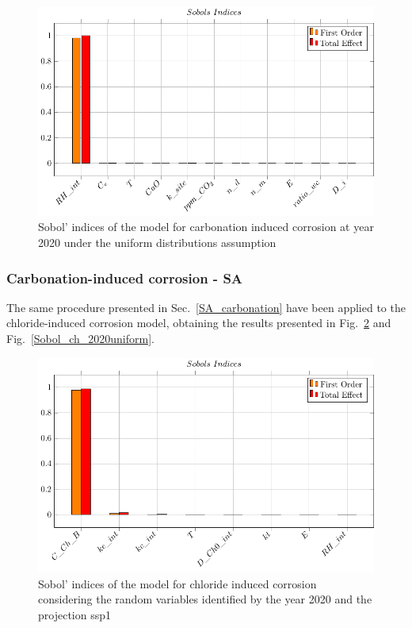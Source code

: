 \begin{figure}[H]
    \centering
    \includegraphics[width=\linewidth]{imgs/pdfs/sobols_indices/carbonation/17_sobols_2020_ssp1.pdf}
    \caption{Sobol' indices of the model for carbonation induced corrosion at year 2020 under the uniform distributions assumption}\label{Sobol_carb_2020uniform}
\end{figure}

\subsubsection{Carbonation-induced corrosion - SA}
The same procedure presented in Sec.~\ref{SA_carbonation} have been applied to the chloride-induced corrosion model, obtaining the results presented in Fig.~\ref{Sobol_ch_2020ssp1} and Fig.~\ref{Sobol_ch_2020uniform}.
\begin{figure}[H]
    \centering
    \includegraphics[width=\linewidth]{imgs/pdfs/sobols_indices/chloride/19_sobols_withRH_2020_ssp1.pdf}
    \caption{Sobol' indices of the model for chloride induced corrosion considering the random variables identified by the year 2020 and the projection ssp1}\label{Sobol_ch_2020ssp1}
\end{figure}

